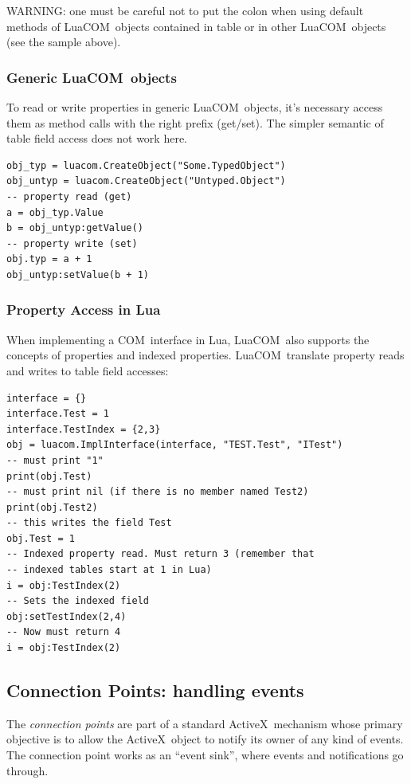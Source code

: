 \documentclass[11pt,a4paper,english]{report}
\newcommand{\techname}[1]{\mbox{#1}}
\newcommand{\lua}{\techname{Lua}}
\newcommand{\com}{\techname{COM}}
\newcommand{\activex}{\techname{ActiveX}}
\newcommand{\luacom}{\techname{LuaCOM}}
\begin{document}
WARNING: one must be careful not to put the colon when using default methods of
\luacom\ objects contained in table or in other \luacom\ objects (see
the sample above).




\subsubsection{Generic \luacom\ objects}
\label{sec:gener-luac-objects}
To read or write properties in generic \luacom\ objects, it's
necessary access them as method calls with the right prefix
(get/set). The simpler semantic of table field access does not work
here.

\begin{verbatim}
obj_typ = luacom.CreateObject("Some.TypedObject")
obj_untyp = luacom.CreateObject("Untyped.Object")
-- property read (get)
a = obj_typ.Value
b = obj_untyp:getValue()
-- property write (set)
obj.typ = a + 1
obj_untyp:setValue(b + 1)
\end{verbatim}


\subsubsection{Property Access in \lua}

When implementing a \com\
interface in \lua, \luacom\ also supports the concepts of properties and
indexed properties. \luacom\ translate property reads and writes to
table field accesses:

\begin{verbatim}
interface = {}
interface.Test = 1
interface.TestIndex = {2,3}
obj = luacom.ImplInterface(interface, "TEST.Test", "ITest")
-- must print "1"
print(obj.Test)
-- must print nil (if there is no member named Test2)
print(obj.Test2)
-- this writes the field Test
obj.Test = 1
-- Indexed property read. Must return 3 (remember that
-- indexed tables start at 1 in Lua)
i = obj:TestIndex(2)
-- Sets the indexed field
obj:setTestIndex(2,4)
-- Now must return 4
i = obj:TestIndex(2)
\end{verbatim}


\subsection{Connection Points: handling events}
\label{sec:conn-points:-handl}
  The \emph{connection points} are part of a standard \activex\
  mechanism whose primary objective is to allow the \activex\ object
  to notify its owner of any kind of events. The connection point
  works as an ``event sink'', where events and notifications go
  through.
\end{document}

